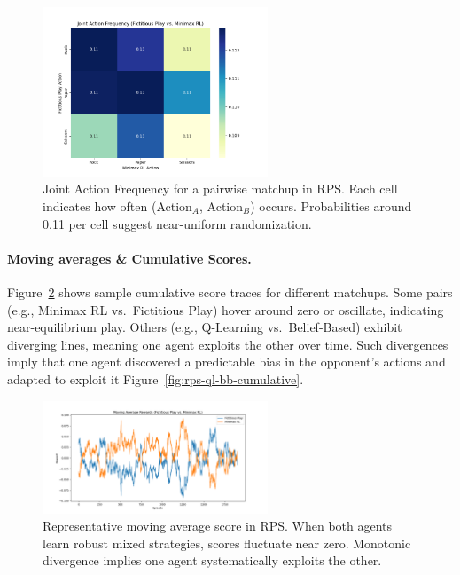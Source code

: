 \documentclass[11pt]{article}
\begin{document}
\begin{figure}[htbp]
    \centering
    \includegraphics[width=0.6\textwidth]{rps-plots/fp_vs_mm_joint_actions.png}
    \caption{Joint Action Frequency for a pairwise matchup in RPS. Each 
    cell indicates how often (Action$_{A}$, Action$_{B}$) occurs. 
    Probabilities around 0.11 per cell suggest near-uniform randomization.}
    \label{fig:rps-joint-heatmap}
\end{figure}

\paragraph{Moving averages \& Cumulative Scores.}
Figure~\ref{fig:rps-fp-mm-rewards} shows sample cumulative score traces 
for different matchups. Some pairs (e.g., Minimax RL vs.\ Fictitious Play) 
hover around zero or oscillate, indicating near-equilibrium play. Others 
(e.g., Q-Learning vs.\ Belief-Based) exhibit diverging lines, meaning one 
agent exploits the other over time. Such divergences imply that one 
agent discovered a predictable bias in the opponent's actions and 
adapted to exploit it Figure~\ref{fig:rps-ql-bb-cumulative}.

\begin{figure}[htbp]
    \centering
    \includegraphics[width=0.6\textwidth]{rps-plots/fp_vs_mm_rewards.png}
    \caption{Representative moving average score in RPS. When both 
    agents learn robust mixed strategies, scores fluctuate near zero. 
    Monotonic divergence implies one agent systematically exploits the other.}
    \label{fig:rps-fp-mm-rewards}
\end{figure}
\end{document}
